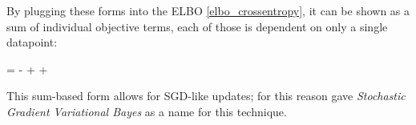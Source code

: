 By plugging these forms into the ELBO \eqref{elbo_crossentropy},
it can be shown as a sum of individual objective terms, each of those
is dependent on only a single datapoint:
\begin{nalign}
\elboX = \sumiN -\entropy{\qphizi,\pzi} + \entropy{\qphizi } + \expectqphizi{\log \pxicondi}
\end{nalign}

This sum-based form allows for SGD-like updates; for this reason \cite{1312.6114}
gave \emph{Stochastic Gradient Variational Bayes} as a name for this technique.
